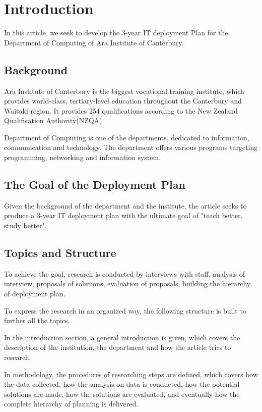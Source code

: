 

\section{Introduction}

In this article, we seek to develop the 3-year IT deployment Plan for the Department of Computing of Ara Institute of Canterbury.

\subsection{Background}
Ara Institute of Canterbury is the biggest vocational training institute, which provides world-class, tertiary-level education throughout the Canterbury and Waitaki region. It provides 254 qualifications according to the New Zealand Qualification Authority(NZQA).

Department of Computing is one of the departments, dedicated to information, communication and technology. The department offers various programs targeting programming, networking and information system.


\subsection{The Goal of the Deployment Plan}
Given the background of the department and the institute, the article seeks to produce a 3-year IT deployment plan with the ultimate goal of "teach better, study better".


\subsection{Topics and Structure}
To achieve the goal, research is conducted by interviews with staff, analysis of interview, proposals of solutions, evaluation of proposals, building the hierarchy of deployment plan.

To express the research in an organized way, the following structure is built to further all the topics.

In the introduction section, a general introduction is given, which covers the description of the institution, the department and how the article tries to research.

In methodology, the procedures of researching steps are defined, which covers how the data collected, how the analysis on data is conducted, how the potential solutions are made, how the solutions are evaluated, and eventually how the complete hierarchy of planning is delivered.

